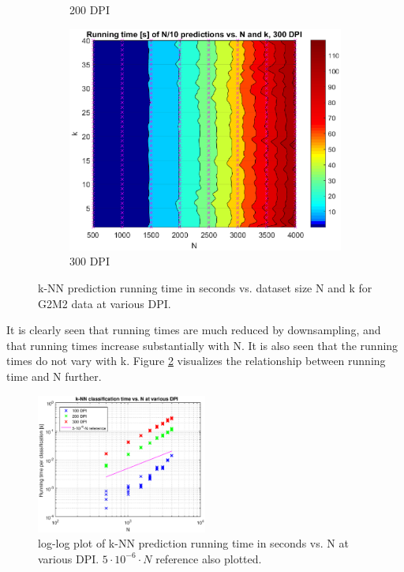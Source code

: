 \begin{figure}[ht]
\begin{subfigure}[t]{0.33\textwidth}
		\caption{200 DPI}
	\end{subfigure}
	\begin{subfigure}[t]{0.33\textwidth}
		\includegraphics[width = \textwidth]{graphics/knn-runningtime-vs-n-and-k-2-2-dpi300}
		\caption{300 DPI}
	\end{subfigure}
	\caption{
		k-NN prediction running time in seconds
		vs. dataset size N and k for G2M2 data at various DPI.
		}
	\label{fig:knn-runningtime-vs-n-and-k}
\end{figure}

It is clearly seen that running times are much reduced by downsampling,
and that running times increase substantially with N. It is also seen that
the running times do not vary with k.
Figure \ref{fig:knn-runningtime-vs-n-loglog} visualizes the relationship
between running time and N further.
\begin{figure}[ht]
	\centering
	\includegraphics[width = 0.5\textwidth]{graphics/knn-runningtime-vs-n-loglog-2-2}
	\caption{
		log-log plot of k-NN prediction running time in seconds vs. N at various DPI.
		\(5\cdot{}10^{-6}\cdot{}N\) reference also plotted.
	}
	\label{fig:knn-runningtime-vs-n-loglog}
\end{figure}

